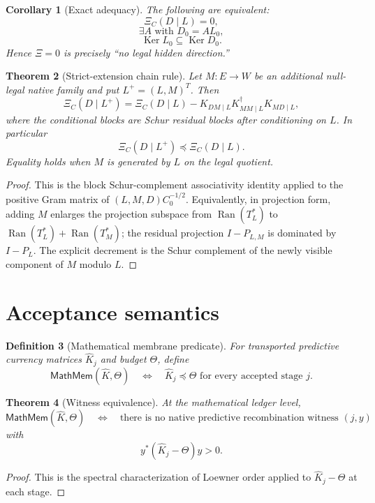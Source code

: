 \documentclass[11pt]{article}
\newtheorem{theorem}{Theorem}[section]
\newtheorem{corollary}[theorem]{Corollary}
\newtheorem{definition}[theorem]{Definition}
\DeclareMathOperator{\Ran}{Ran}
\DeclareMathOperator{\Ker}{Ker}
\begin{document}
\begin{corollary}[Exact adequacy]
The following are equivalent:
\[
  \Xi_C(D\mid L)=0,
\]
\[
  \exists A\text{ with }D_0=AL_0,
\]
\[
  \Ker L_0\subseteq\Ker D_0.
\]
Hence \(\Xi=0\) is precisely ``no legal hidden direction.''
\end{corollary}

\begin{theorem}[Strict-extension chain rule]
Let \(M:E\to W\) be an additional null-legal native family and put \(L^+=(L,M)^T\).  Then
\[
  \Xi_C(D\mid L^+)
  =\Xi_C(D\mid L)-K_{DM\mid L}K_{MM\mid L}^\dagger K_{MD\mid L},
\]
where the conditional blocks are Schur residual blocks after conditioning on \(L\).  In particular
\[
  \Xi_C(D\mid L^+)\preceq\Xi_C(D\mid L).
\]
Equality holds when \(M\) is generated by \(L\) on the legal quotient.
\end{theorem}

\begin{proof}
This is the block Schur-complement associativity identity applied to the positive Gram matrix of \((L,M,D)C_0^{-1/2}\).  Equivalently, in projection form, adding \(M\) enlarges the projection subspace from \(\Ran(T_L^*)\) to \(\Ran(T_L^*)+\Ran(T_M^*)\); the residual projection \(I-P_{L,M}\) is dominated by \(I-P_L\).  The explicit decrement is the Schur complement of the newly visible component of \(M\) modulo \(L\).
\end{proof}

\section{Acceptance semantics}

\begin{definition}[Mathematical membrane predicate]
For transported predictive currency matrices \(\widehat K_j\) and budget \(\Theta\), define
\[
  \mathsf{MathMem}(\widehat K,\Theta)
  \quad\Longleftrightarrow\quad
  \widehat K_j\preceq\Theta\text{ for every accepted stage }j.
\]
\end{definition}

\begin{theorem}[Witness equivalence]
At the mathematical ledger level,
\[
  \mathsf{MathMem}(\widehat K,\Theta)
  \quad\Longleftrightarrow\quad
  \text{there is no native predictive recombination witness }(j,y)
\]
with
\[
  y^*(\widehat K_j-\Theta)y>0.
\]
\end{theorem}

\begin{proof}
This is the spectral characterization of Loewner order applied to \(\widehat K_j-\Theta\) at each stage.
\end{proof}
\end{document}
